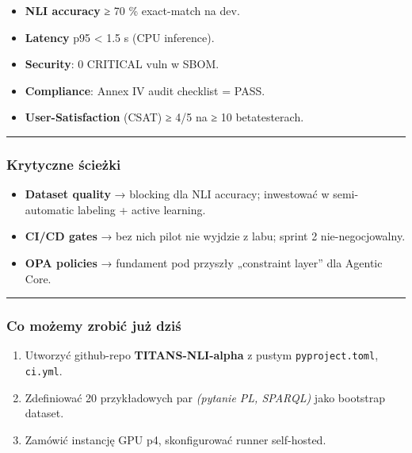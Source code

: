 \documentclass[letterpaper,twocolumn]{article}
\providecommand{\tightlist}{%
  \setlength{\itemsep}{0pt}\setlength{\parskip}{0pt}}
\begin{document}
\begin{itemize}
\tightlist
\item
  \textbf{NLI accuracy} ≥ 70 \% exact-match na dev.
\item
  \textbf{Latency} p95 \textless{} 1.5 s (CPU inference).
\item
  \textbf{Security}: 0 CRITICAL vuln w SBOM.
\item
  \textbf{Compliance}: Annex IV audit checklist = PASS.
\item
  \textbf{User-Satisfaction} (CSAT) ≥ 4/5 na ≥ 10 betatesterach.
\end{itemize}

\begin{center}\rule{0.5\linewidth}{0.5pt}\end{center}

\hypertarget{krytyczne-ux15bcieux17cki}{%
\subsubsection{Krytyczne ścieżki}\label{krytyczne-ux15bcieux17cki}}

\begin{itemize}
\tightlist
\item
  \textbf{Dataset quality} → blocking dla NLI accuracy; inwestować w
  semi-automatic labeling + active learning.
\item
  \textbf{CI/CD gates} → bez nich pilot nie wyjdzie z labu; sprint 2
  nie-negocjowalny.
\item
  \textbf{OPA policies} → fundament pod przyszły „constraint layer'' dla
  Agentic Core.
\end{itemize}

\begin{center}\rule{0.5\linewidth}{0.5pt}\end{center}

\hypertarget{co-moux17cemy-zrobiux107-juux17c-dziux15b}{%
\subsubsection{Co możemy zrobić już
dziś}\label{co-moux17cemy-zrobiux107-juux17c-dziux15b}}

\begin{enumerate}
\def\labelenumi{\arabic{enumi}.}
\tightlist
\item
  Utworzyć github-repo \textbf{TITANS-NLI-alpha} z pustym
  \texttt{pyproject.toml}, \texttt{ci.yml}.
\item
  Zdefiniować 20 przykładowych par \emph{(pytanie PL, SPARQL)} jako
  bootstrap dataset.
\item
  Zamówić instancję GPU p4, skonfigurować runner self-hosted.
\end{enumerate}
\end{document}
